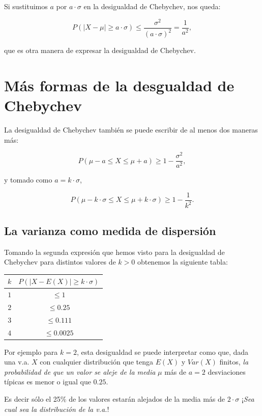\documentclass[
  letterpaper,
  DIV=11,
  numbers=noendperiod]{scrreprt}
\begin{document}
Si sustituimos \(a\) por \(a\cdot \sigma\) en la desigualdad de
Chebychev, nos queda:

\[
P(|X-\mu|\geq a\cdot \sigma)\leq
\frac{\sigma^2}{(a\cdot \sigma)^2}=\frac1{a^2},
\]

que es otra manera de expresar la desigualdad de Chebychev.

\section{Más formas de la desgualdad de
Chebychev}\label{muxe1s-formas-de-la-desgualdad-de-chebychev}

La desigualdad de Chebychev también se puede escribir de al menos dos
maneras más:

\[
P(\mu-a\leq X\leq \mu+a)\geq 1-\frac{\sigma^2}{a^2},
\]

y tomado como \(a=k\cdot \sigma\),

\[
P(\mu-k\cdot \sigma\leq X\leq \mu+ k \cdot \sigma)\geq 1-\frac1{k^2}.
\]

\subsection{La varianza como medida de
dispersión}\label{la-varianza-como-medida-de-dispersiuxf3n}

Tomando la segunda expresión que hemos visto para la desigualdad de
Chebychev para distintos valores de \(k>0\) obtenemos la siguiente
tabla:

\begin{table}
\centering
\begin{tabular}{|c|c|}
$k$ &  $P\left(|X-E(X)|\geq k  \cdot \sigma\right)$\\
\hline
$1$ & $\leq 1$ \\
$2$ & $\leq 0.25$ \\
$3$ & $\leq 0.111$ \\
$4$ & $\leq 0.0025$\\ \hline
\end{tabular}
\end{table}

Por ejemplo para \(k=2\), esta desigualdad se puede interpretar como
que, dada una v.a. \(X\) con cualquier distribución que tenga \(E(X)\) y
\(Var(X)\) finitos, \emph{la probabilidad de que un valor se aleje de la
media} \(\mu\) más de \(a=2\) desviaciones típicas es menor o igual que
\(0.25\).

Es decir sólo el 25\% de los valores estarán alejados de la media más de
\(2\cdot \sigma\) ¡\emph{Sea cual sea la distribución de la v.a.}!
\end{document}

